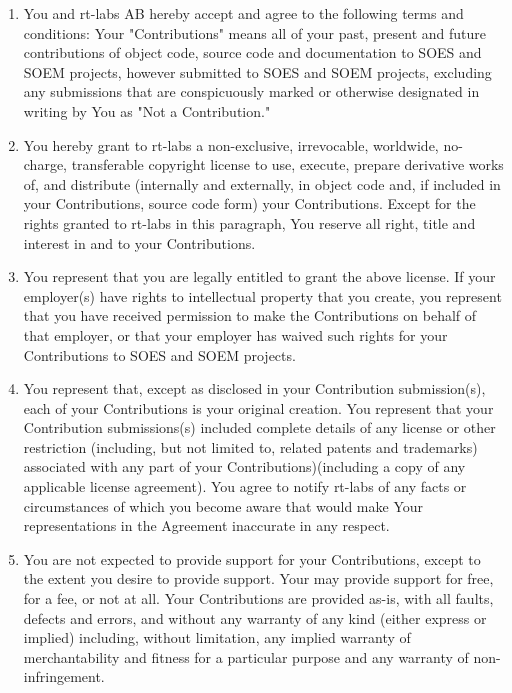 \documentclass[10pt,a4paper]{letter}
\begin{document}
\begin{enumerate}

   \item You and rt-labs AB hereby accept and agree to the following terms and
      conditions: Your "Contributions" means all of your past, present and
      future contributions of object code, source code and documentation to SOES
      and SOEM projects, however submitted to SOES and SOEM projects, excluding
      any submissions that are conspicuously marked or otherwise designated in
      writing by You as "Not a Contribution."

   \item You hereby grant to rt-labs a non-exclusive, irrevocable, worldwide,
      no-charge, transferable copyright license to use, execute, prepare
      derivative works of, and distribute (internally and externally, in object
      code and, if included in your Contributions, source code form) your
      Contributions. Except for the rights granted to rt-labs in this paragraph,
      You reserve all right, title and interest in and to your Contributions.

   \item You represent that you are legally entitled to grant the above license.
      If your employer(s) have rights to intellectual property that you create,
      you represent that you have received permission to make the Contributions
      on behalf of that employer, or that your employer has waived such rights
      for your Contributions to SOES and SOEM projects.

   \item You represent that, except as disclosed in your Contribution
      submission(s), each of your Contributions is your original creation. You
      represent that your Contribution submissions(s) included complete details
      of any license or other restriction (including, but not limited to,
      related patents and trademarks) associated with any part of your
      Contributions)(including a copy of any applicable license agreement). You
      agree to notify rt-labs of any facts or circumstances of which you become
      aware that would make Your representations in the Agreement inaccurate in
      any respect.

   \item You are not expected to provide support for your Contributions, except
      to the extent you desire to provide support. Your may provide support for
      free, for a fee, or not at all. Your Contributions are provided as-is,
      with all faults, defects and errors, and without any warranty of any kind
      (either express or implied) including, without limitation, any implied
      warranty of merchantability and fitness for a particular purpose and any
      warranty of non-infringement.

\end{enumerate}
\end{document}
